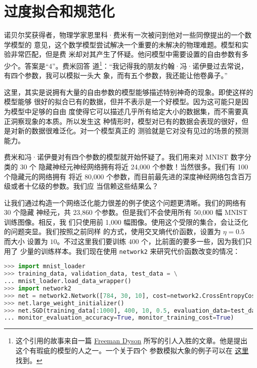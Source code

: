 \section{过度拟合和规范化}
\label{sec:overfitting_and_regularization}

诺贝尔奖获得者，物理学家恩里科·费米有一次被问到他对一些同僚提出的一个数学模型的
意见，这个数学模型尝试解决一个重要的未解决的物理难题。模型和实验非常匹配，但是费
米却对其产生了怀疑。他问模型中需要设置的自由参数有多少个。答案是“4”。费米回答
道\footnote{这个引用的故事来自一篇
  \href{http://www.nature.com/nature/journal/v427/n6972/full/427297a.html}{Freeman
    Dyson} 所写的引人入胜的文章。他是提出这个有瑕疵的模型的人之一。一个关于四个
  参数模拟大象的例子可以在%
  \href{http://www.johndcook.com/blog/2011/06/21/how-to-fit-an-elephant/}{这里}%
  找到。}：“我记得我的朋友约翰·冯·诺伊曼过去常说，有四个参数，我可以模拟一头大
象，而有五个参数，我还能让他卷鼻子。”

这里，其实是说拥有大量的自由参数的模型能够描述特别神奇的现象。即使这样的模型能够
很好的拟合已有的数据，但并不表示是一个好模型。因为这可能只是因为模型中足够的自由
度使得它可以描述几乎所有给定大小的数据集，而不需要真正洞察现象的本质。所以发生这
种情形时，模型对已有的数据会表现的很好，但是对新的数据很难泛化。对一个模型真正的
测验就是它对没有见过的场景的预测能力。

费米和冯·诺伊曼对有四个参数的模型就开始怀疑了。我们用来对 MNIST 数字分类的 30 个
隐藏神经元神经网络拥有将近 24,000 个参数！当然很多。我们有 100 个隐藏元的网络拥有
将近 80,000 个参数，而目前最先进的深度神经网络包含百万级或者十亿级的参数。我们应
当信赖这些结果么？

让我们通过构造一个网络泛化能力很差的例子使这个问题更清晰。我们的网络有 30 个隐藏
神经元，共 23,860 个参数。但是我们不会使用所有 50,000 幅 MNIST 训练图像。相反，我
们只使用前 1,000 幅图像。使用这个受限的集合，会让泛化的问题突显。我们按照之前同样
的方式，使用交叉熵代价函数，\learningrate{}设置为 $\eta = 0.5$ 而\minibatch{}大小
设置为 $10$。不过这里我们要训练 400 个\epochs{}，比前面的要多一些，因为我们只用了
少量的训练样本。我们现在使用 \lstinline!network2! 来研究代价函数改变的情况：

\begin{lstlisting}[language=Python]
>>> import mnist_loader
>>> training_data, validation_data, test_data = \
... mnist_loader.load_data_wrapper()
>>> import network2
>>> net = network2.Network([784, 30, 10], cost=network2.CrossEntropyCost)
>>> net.large_weight_initializer()
>>> net.SGD(training_data[:1000], 400, 10, 0.5, evaluation_data=test_data,
... monitor_evaluation_accuracy=True, monitor_training_cost=True)
\end{lstlisting}

